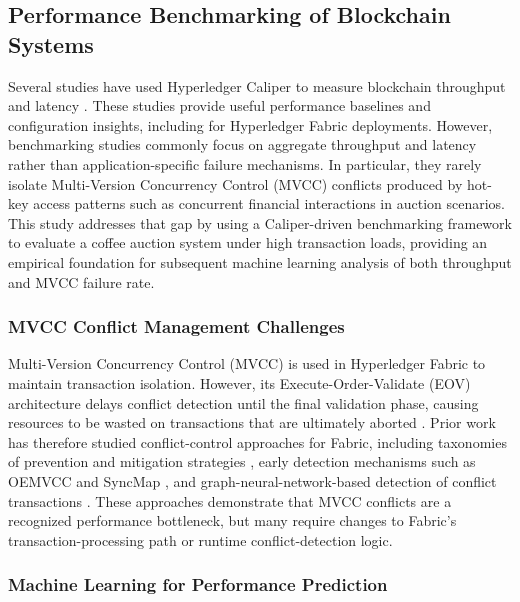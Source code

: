 ﻿\documentclass[12pt]{article}
\begin{document}
	\subsection{Performance Benchmarking of Blockchain Systems}
	
	Several studies have used Hyperledger Caliper to measure blockchain throughput and latency \cite{kumar_integrating_2026, kaushal_convergence_2025, thakkar_performance_2018, el_hajji_optimization_2024}. These studies provide useful performance baselines and configuration insights, including for Hyperledger Fabric deployments. However, benchmarking studies commonly focus on aggregate throughput and latency rather than application-specific failure mechanisms. In particular, they rarely isolate Multi-Version Concurrency Control (MVCC) conflicts produced by hot-key access patterns such as concurrent financial interactions in auction scenarios. This study addresses that gap by using a Caliper-driven benchmarking framework to evaluate a coffee auction system under high transaction loads, providing an empirical foundation for subsequent machine learning analysis of both throughput and MVCC failure rate.
	
	\subsubsection{MVCC Conflict Management Challenges}

Multi-Version Concurrency Control (MVCC) is used in Hyperledger Fabric to maintain transaction isolation. However, its Execute-Order-Validate (EOV) architecture delays conflict detection until the final validation phase, causing resources to be wasted on transactions that are ultimately aborted \cite{Alexandros_Performance_2024}. Prior work has therefore studied conflict-control approaches for Fabric, including taxonomies of prevention and mitigation strategies \cite{debreczeni_transaction_2024}, early detection mechanisms such as OEMVCC and SyncMap \cite{Alexandros_Performance_2024, Helmi_Early_2023}, and graph-neural-network-based detection of conflict transactions \cite{alzahrani_hfgin_2025}. These approaches demonstrate that MVCC conflicts are a recognized performance bottleneck, but many require changes to Fabric's transaction-processing path or runtime conflict-detection logic.

\subsubsection{Machine Learning for Performance Prediction}
\end{document}
